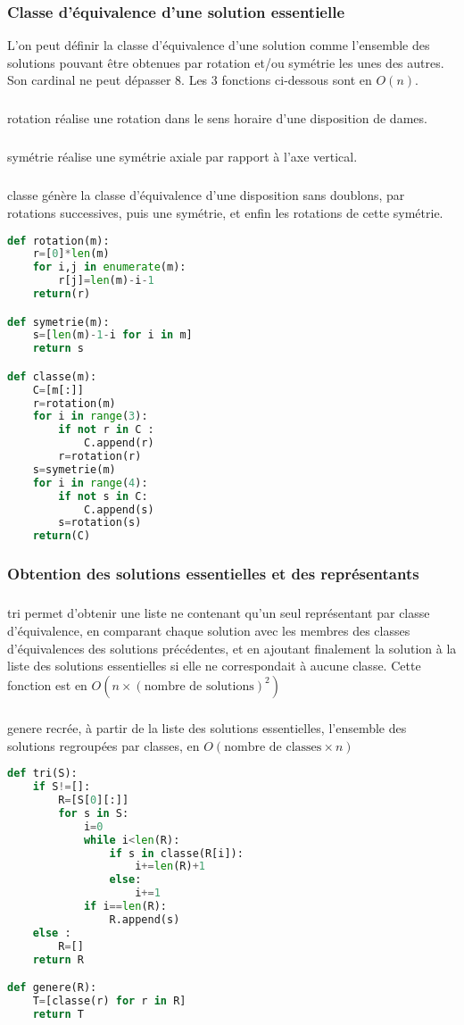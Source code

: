 \documentclass[a4paper]{article}
\begin{document}
\subsubsection{Classe d'équivalence d'une solution essentielle}
L'on peut définir la classe d'équivalence d'une solution comme l'ensemble des solutions pouvant être obtenues par rotation et/ou symétrie les unes des autres. Son cardinal ne peut dépasser $8$. Les 3 fonctions ci-dessous sont en $O(n)$.
\subparagraph{}
rotation réalise une rotation dans le sens horaire d'une disposition de dames.
\subparagraph{}
symétrie réalise une symétrie axiale par rapport à l'axe vertical.
\subparagraph{}
classe génère la classe d'équivalence d'une disposition sans doublons, par rotations successives, puis une symétrie, et enfin les rotations de cette symétrie.
\begin{lstlisting}[language=Python,keywordstyle=\color{blue},stringstyle=\color{red},commentstyle=\color{green}]
def rotation(m):
    r=[0]*len(m)
    for i,j in enumerate(m):
        r[j]=len(m)-i-1
    return(r)

def symetrie(m):
    s=[len(m)-1-i for i in m]
    return s

def classe(m):
    C=[m[:]]
    r=rotation(m)
    for i in range(3):
        if not r in C :
            C.append(r)
        r=rotation(r)
    s=symetrie(m)
    for i in range(4):
        if not s in C:
            C.append(s)
        s=rotation(s)
    return(C)
\end{lstlisting}

\subsubsection{Obtention des solutions essentielles et des représentants}
\subparagraph{}
tri permet d'obtenir une liste ne contenant qu'un seul représentant par classe d'équivalence, en comparant chaque solution avec les membres des classes d'équivalences des solutions précédentes, et en ajoutant finalement la solution à la liste des solutions essentielles si elle ne correspondait à aucune classe. Cette fonction est en $O(n \times (\text{nombre de solutions})^{2})$

\subparagraph{}
genere recrée, à partir de la liste des solutions essentielles, l'ensemble des solutions regroupées par classes, en $O(\text{nombre de classes} \times n)$
\begin{lstlisting}[language=Python,keywordstyle=\color{blue},stringstyle=\color{red},commentstyle=\color{green}]
def tri(S):
    if S!=[]:
        R=[S[0][:]]
        for s in S:
            i=0
            while i<len(R):
                if s in classe(R[i]):
                    i+=len(R)+1
                else:
                    i+=1
            if i==len(R):
                R.append(s)
    else :
        R=[]
    return R

def genere(R):
    T=[classe(r) for r in R]
    return T
\end{lstlisting}
\end{document}
